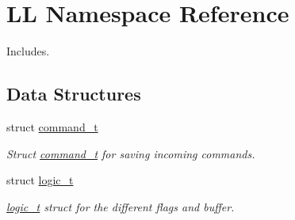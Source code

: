 \hypertarget{namespace_l_l}{}\section{LL Namespace Reference}
\label{namespace_l_l}


Includes.  


\subsection*{Data Structures}
\begin{DoxyCompactItemize}
\item 
struct \mbox{\hyperlink{struct_l_l_1_1command__t}{command\+\_\+t}}
\begin{DoxyCompactList}\small\item\em Struct \mbox{\hyperlink{struct_l_l_1_1command__t}{command\+\_\+t}} for saving incoming commands. \end{DoxyCompactList}\item 
struct \mbox{\hyperlink{struct_l_l_1_1logic__t}{logic\+\_\+t}}
\begin{DoxyCompactList}\small\item\em \mbox{\hyperlink{struct_l_l_1_1logic__t}{logic\+\_\+t}} struct for the different flags and buffer. \end{DoxyCompactList}\end{DoxyCompactItemize}
